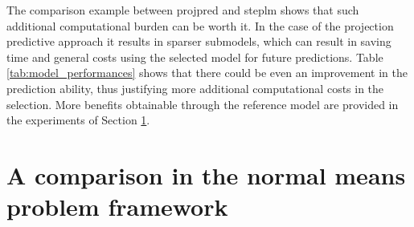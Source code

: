 \documentclass[american,]{article}
\theoremstyle{definition}
\begin{document}
The comparison example between projpred and steplm shows that such additional computational burden can be worth it. In the case of the projection predictive approach it results in sparser submodels, which can result in saving time and general costs using the selected model for future predictions. Table \ref{tab:model_performances} shows that there could be even an improvement in the prediction ability, thus justifying more additional computational costs in the selection. More benefits obtainable through the reference model are provided in the experiments of Section \ref{comparison}.


\hypertarget{comparison}{%
\section{A comparison in the normal means problem framework}\label{comparison}}
\end{document}
